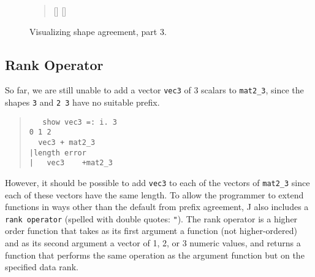 \begin{figure}[hptbp]\ContinuedFloat
\begin{quote}
\begin{singlespacing}
\begin{small}
[\PartLineWidth]{
}%
\hfill%
[\PartLineWidth]{
} 
\end{small}
\end{singlespacing}
\end{quote}
\caption{Visualizing shape agreement, part 3.}
\label{fig:agree3}
\end{figure}

\pagebreak

\subsection{Rank Operator}
So far, we are still unable to add a vector \texttt{vec3} of 3 scalars to \texttt{mat2\_3}, 
since the shapes \texttt{3} and \texttt{2 3} have no suitable prefix.

\begin{quote}
\begin{singlespacing}
\begin{small}
\begin{verbatim}
   show vec3 =: i. 3
0 1 2
  vec3 + mat2_3
|length error
|   vec3    +mat2_3
\end{verbatim}
\end{small}
\end{singlespacing}
\end{quote}

\noindent However, it should be possible to add \texttt{vec3} to each of the vectors of \texttt{mat2\_3} 
since each of these vectors have the same length.
To allow the programmer to extend functions in ways other than the default from prefix agreement, 
J also includes a \texttt{rank operator} (spelled with double quotes: \texttt{"}).
The rank operator is a higher order function that takes as its first argument a function (not higher-ordered) %
and as its second argument a vector of 1, 2, or 3 numeric values, 
and returns a function that performs the same operation as the argument function but on the specified data rank\cite{rankanduni}.

